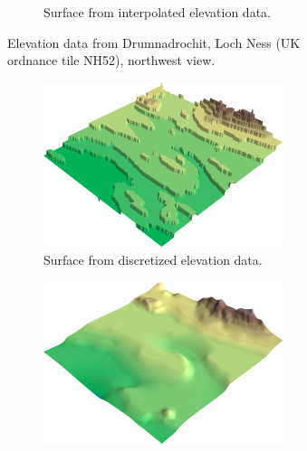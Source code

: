 \documentclass[a4paper,10pt]{report}
\begin{document}
\begin{figure}[H]
\begin{subfigure}{\textwidth}
\begin{subfigure}{.49\textwidth}
        \addtocounter{subfigure}{-1}
        \renewcommand\thesubfigure{\alph{subfigure}) ii}
        \caption{Surface from interpolated elevation data.}
        \end{subfigure}
        \addtocounter{subfigure}{-1}
        \renewcommand\thesubfigure{\alph{subfigure}}
        \caption{Elevation data from Drumnadrochit, Loch Ness (UK ordnance tile NH52), northwest view.}
        \label{fig:3D_discretized_interpolation_a}
    \end{subfigure}
    \begin{subfigure}{\textwidth}
        \centering
        \begin{subfigure}{.49\textwidth}
            \includegraphics[width=\textwidth]{../images/NO33/2D_Data_Interpolation_3D_discretized_datagrid.png}
        \renewcommand\thesubfigure{\alph{subfigure}) i}
        \caption{Surface from discretized elevation data.}
        \end{subfigure}
        \hfill
        \begin{subfigure}{.49\textwidth}
            \includegraphics[width=\textwidth]{../images/NO33/2D_Data_Interpolation_3D_discretized_datagrid_interpolated.png}

\end{subfigure}
\end{subfigure}
\end{figure}
\end{document}
